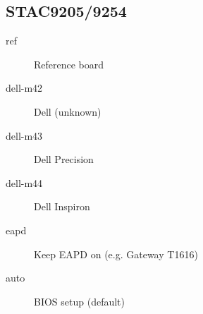 \documentclass[a4paper,8pt,english]{sphinxmanual}
\begin{document}
\subsection{STAC9205/9254}
\label{sound/hd-audio/models:stac9205-9254}\begin{description}
\item[{ref}] \leavevmode
Reference board

\item[{dell-m42}] \leavevmode
Dell (unknown)

\item[{dell-m43}] \leavevmode
Dell Precision

\item[{dell-m44}] \leavevmode
Dell Inspiron

\item[{eapd}] \leavevmode
Keep EAPD on (e.g. Gateway T1616)

\item[{auto}] \leavevmode
BIOS setup (default)

\end{description}
\end{document}
